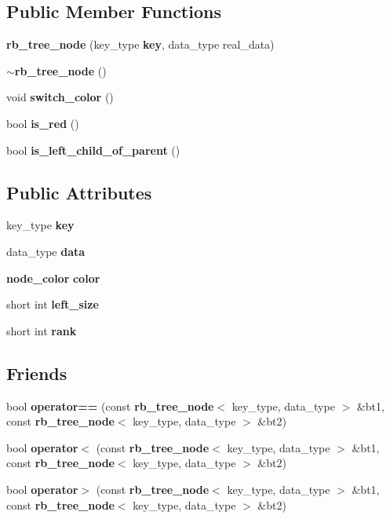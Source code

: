 \subsection*{Public Member Functions}
\begin{DoxyCompactItemize}
\item 
\textbf{ rb\+\_\+tree\+\_\+node} (key\+\_\+type \textbf{ key}, data\+\_\+type real\+\_\+data)
\item 
\textbf{ $\sim$rb\+\_\+tree\+\_\+node} ()
\item 
void \textbf{ switch\+\_\+color} ()
\item 
bool \textbf{ is\+\_\+red} ()
\item 
bool \textbf{ is\+\_\+left\+\_\+child\+\_\+of\+\_\+parent} ()
\end{DoxyCompactItemize}
\subsection*{Public Attributes}
\begin{DoxyCompactItemize}
\item 
key\+\_\+type \textbf{ key}
\item 
data\+\_\+type \textbf{ data}
\item 
\textbf{ node\+\_\+color} \textbf{ color}
\item 
short int \textbf{ left\+\_\+size}
\item 
short int \textbf{ rank}
\end{DoxyCompactItemize}
\subsection*{Friends}
\begin{DoxyCompactItemize}
\item 
bool \textbf{ operator==} (const \textbf{ rb\+\_\+tree\+\_\+node}$<$ key\+\_\+type, data\+\_\+type $>$ \&bt1, const \textbf{ rb\+\_\+tree\+\_\+node}$<$ key\+\_\+type, data\+\_\+type $>$ \&bt2)
\item 
bool \textbf{ operator$<$} (const \textbf{ rb\+\_\+tree\+\_\+node}$<$ key\+\_\+type, data\+\_\+type $>$ \&bt1, const \textbf{ rb\+\_\+tree\+\_\+node}$<$ key\+\_\+type, data\+\_\+type $>$ \&bt2)
\item 
bool \textbf{ operator$>$} (const \textbf{ rb\+\_\+tree\+\_\+node}$<$ key\+\_\+type, data\+\_\+type $>$ \&bt1, const \textbf{ rb\+\_\+tree\+\_\+node}$<$ key\+\_\+type, data\+\_\+type $>$ \&bt2)
\end{DoxyCompactItemize}


